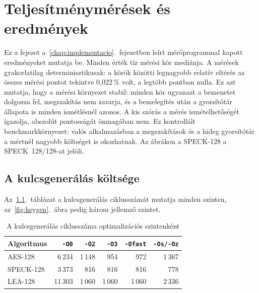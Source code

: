 \documentclass[a4paper,12pt]{report}
\theoremstyle{definition}
\theoremstyle{remark}
\begin{document}
\chapter{Teljesítménymérések és eredmények}\label{chap:meresek}

Ez a fejezet a~\ref{chap:implementacio}.~fejezetben leírt mérőprogrammal kapott eredményeket mutatja be. Minden érték tíz mérési kör mediánja. A mérések gyakorlatilag determinisztikusak: a körök közötti legnagyobb relatív eltérés az összes mérési pontot tekintve 0,022\,\% volt, a legtöbb pontban nulla. Ez azt mutatja, hogy a mérési környezet stabil: minden kör ugyanazt a bemenetet dolgozza fel, megszakítás nem zavarja, és a bemelegítés után a gyorsítótár állapota is minden ismétlésnél azonos. A kis szórás a mérés ismételhetőségét igazolja, abszolút pontosságát önmagában nem. Ez kontrollált benchmarkkörnyezet: valós alkalmazásban a megszakítások és a hideg gyorsítótár a mértnél nagyobb költséget is okozhatnak. Az ábrákon a SPECK-128 a SPECK~128/128-at jelöli.

\section{A kulcsgenerálás költsége}\label{sec:keygen}

Az~\ref{tab:keygen}.~táblázat a kulcsgenerálás ciklusszámát mutatja minden szinten, az~\ref{fig:keygen}.~ábra pedig három jellemző szintet.

\begin{table}[!htbp]
    \centering
    \small
    \caption{A kulcsgenerálás ciklusszáma optimalizációs szintenként}
    \label{tab:keygen}
    \begin{tabular}{|l|r|r|r|r|r|}
        \hline
        \textbf{Algoritmus} & \textbf{\texttt{-O0}} & \textbf{\texttt{-O2}} & \textbf{\texttt{-O3}} & \textbf{\texttt{-Ofast}} & \textbf{\texttt{-Os/-Oz}} \\ \hline
        AES-128    & 6\,234  & 1\,148 & 954    & 972    & 1\,367 \\ \hline
        SPECK-128  & 3\,373  & 816    & 816    & 816    & 778    \\ \hline
        LEA-128    & 11\,303 & 1\,060 & 1\,060 & 1\,060 & 2\,336 \\ \hline
    \end{tabular}
\end{table}
\end{document}

